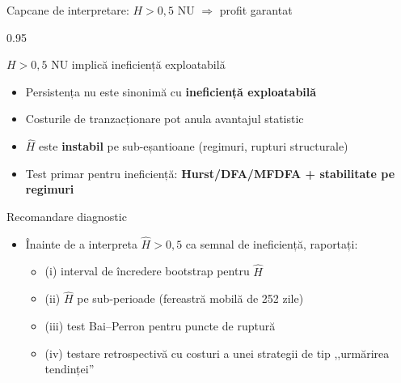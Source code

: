 \documentclass[9pt, aspectratio=169, t]{beamer}
\begin{document}
\begin{frame}[shrink=15]{Capcane de interpretare: $H>0{,}5$ NU $\Rightarrow$ profit garantat}
\begin{cminipage}{0.95\textwidth}
\begin{alertblock}{$H>0{,}5$ NU implică ineficiență exploatabilă}
\begin{itemize}\setlength{\itemsep}{2pt}
    \item Persistența nu este sinonimă cu \textbf{ineficiență exploatabilă}
    \item Costurile de tranzacționare pot anula avantajul statistic
    \item $\hat H$ este \textbf{instabil} pe sub-eșantioane (regimuri, rupturi structurale)
    \item Test primar pentru ineficiență: \textbf{Hurst/DFA/MFDFA + stabilitate pe regimuri}
\end{itemize}
\end{alertblock}
\begin{exampleblock}{Recomandare diagnostic}
\begin{itemize}\setlength{\itemsep}{0pt}
    \item Înainte de a interpreta $\hat H>0{,}5$ ca semnal de ineficiență, raportați:
    \begin{itemize}\setlength{\itemsep}{0pt}
        \item (i) interval de încredere bootstrap pentru $\hat H$
        \item (ii) $\hat H$ pe sub-perioade (fereastră mobilă de 252 zile)
        \item (iii) test Bai--Perron pentru puncte de ruptură
        \item (iv) testare retrospectivă cu costuri a unei strategii de tip ,,urmărirea tendinței''
    \end{itemize}
\end{itemize}
\end{exampleblock}
\end{cminipage}
\end{frame}
\end{document}
